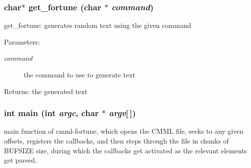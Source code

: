 \subsubsection{\setlength{\rightskip}{0pt plus 5cm}char$\ast$ get\_\-fortune (char $\ast$ {\em command})\hspace{0.3cm}{\tt  [static]}}\label{cmml-fortune_8c_a6}


get\_\-fortune: generates random text using the given command

\begin{Desc}
\item[Parameters:]
\begin{description}
\item[{\em command}]the command to use to generate text\end{description}
\end{Desc}
\begin{Desc}
\item[Returns:]the generated text \end{Desc}
\subsubsection{\setlength{\rightskip}{0pt plus 5cm}int main (int {\em argc}, char $\ast$ {\em argv}[$\,$])}\label{cmml-fortune_8c_a7}


main function of cmml-fortune, which opens the CMML file, seeks to any given offsets, registers the callbacks, and then steps through the file in chunks of BUFSIZE size, during which the callbacks get activated as the relevant elements get parsed. 